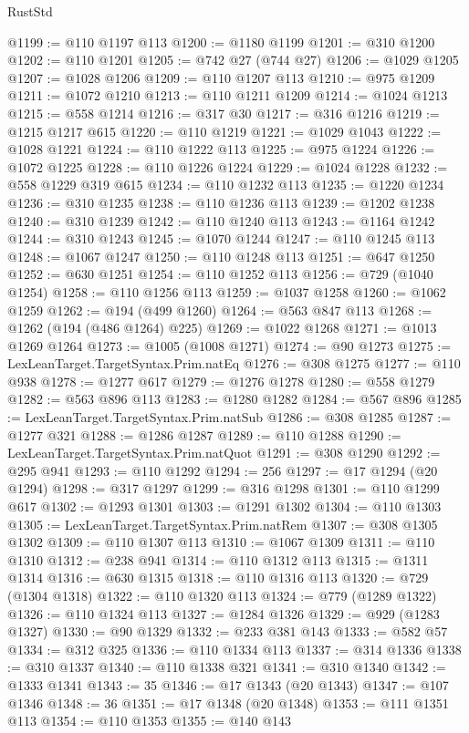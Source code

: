 \begin{lexlean}{RustStd}
\begin{coremodule}
@1199 := @110 @1197 @113
@1200 := @1180 @1199
@1201 := @310 @1200
@1202 := @110 @1201
@1205 := @742 @27 (@744 @27)
@1206 := @1029 @1205
@1207 := @1028 @1206
@1209 := @110 @1207 @113
@1210 := @975 @1209
@1211 := @1072 @1210
@1213 := @110 @1211 @1209
@1214 := @1024 @1213
@1215 := @558 @1214
@1216 := @317 @30
@1217 := @316 @1216
@1219 := @1215 @1217 @615
@1220 := @110 @1219
@1221 := @1029 @1043
@1222 := @1028 @1221
@1224 := @110 @1222 @113
@1225 := @975 @1224
@1226 := @1072 @1225
@1228 := @110 @1226 @1224
@1229 := @1024 @1228
@1232 := @558 @1229 @319 @615
@1234 := @110 @1232 @113
@1235 := @1220 @1234
@1236 := @310 @1235
@1238 := @110 @1236 @113
@1239 := @1202 @1238
@1240 := @310 @1239
@1242 := @110 @1240 @113
@1243 := @1164 @1242
@1244 := @310 @1243
@1245 := @1070 @1244
@1247 := @110 @1245 @113
@1248 := @1067 @1247
@1250 := @110 @1248 @113
@1251 := @647 @1250
@1252 := @630 @1251
@1254 := @110 @1252 @113
@1256 := @729 (@1040 @1254)
@1258 := @110 @1256 @113
@1259 := @1037 @1258
@1260 := @1062 @1259
@1262 := @194 (@499 @1260)
@1264 := @563 @847 @113
@1268 := @1262 (@194 (@486 @1264) @225)
@1269 := @1022 @1268
@1271 := @1013 @1269 @1264
@1273 := @1005 (@1008 @1271)
@1274 := @90 @1273
@1275 := LexLeanTarget.TargetSyntax.Prim.natEq
@1276 := @308 @1275
@1277 := @110 @938
@1278 := @1277 @617
@1279 := @1276 @1278
@1280 := @558 @1279
@1282 := @563 @896 @113
@1283 := @1280 @1282
@1284 := @567 @896
@1285 := LexLeanTarget.TargetSyntax.Prim.natSub
@1286 := @308 @1285
@1287 := @1277 @321
@1288 := @1286 @1287
@1289 := @110 @1288
@1290 := LexLeanTarget.TargetSyntax.Prim.natQuot
@1291 := @308 @1290
@1292 := @295 @941
@1293 := @110 @1292
@1294 := 256
@1297 := @17 @1294 (@20 @1294)
@1298 := @317 @1297
@1299 := @316 @1298
@1301 := @110 @1299 @617
@1302 := @1293 @1301
@1303 := @1291 @1302
@1304 := @110 @1303
@1305 := LexLeanTarget.TargetSyntax.Prim.natRem
@1307 := @308 @1305 @1302
@1309 := @110 @1307 @113
@1310 := @1067 @1309
@1311 := @110 @1310
@1312 := @238 @941
@1314 := @110 @1312 @113
@1315 := @1311 @1314
@1316 := @630 @1315
@1318 := @110 @1316 @113
@1320 := @729 (@1304 @1318)
@1322 := @110 @1320 @113
@1324 := @779 (@1289 @1322)
@1326 := @110 @1324 @113
@1327 := @1284 @1326
@1329 := @929 (@1283 @1327)
@1330 := @90 @1329
@1332 := @233 @381 @143
@1333 := @582 @57
@1334 := @312 @325
@1336 := @110 @1334 @113
@1337 := @314 @1336
@1338 := @310 @1337
@1340 := @110 @1338 @321
@1341 := @310 @1340
@1342 := @1333 @1341
@1343 := 35
@1346 := @17 @1343 (@20 @1343)
@1347 := @107 @1346
@1348 := 36
@1351 := @17 @1348 (@20 @1348)
@1353 := @111 @1351 @113
@1354 := @110 @1353
@1355 := @140 @143

\end{coremodule}
\end{lexlean}
